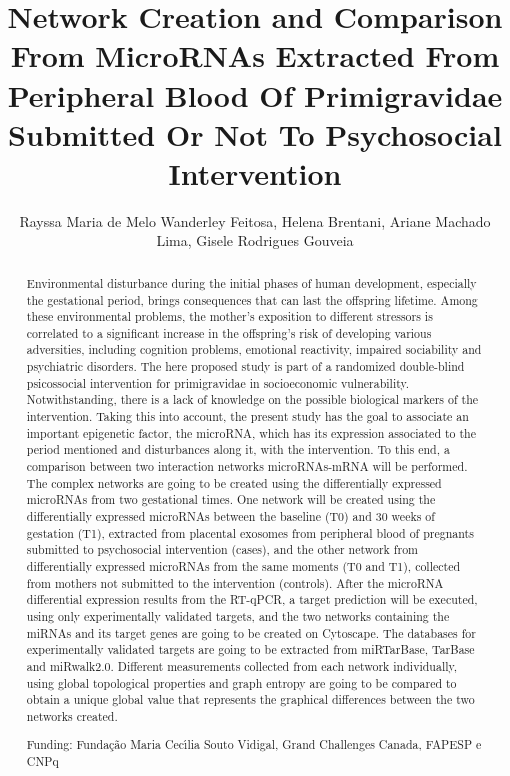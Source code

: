 \documentclass[twoside]{article}
\title{\vspace{-15mm}\fontsize{24pt}{10pt}\selectfont\textbf{ Network Creation and Comparison From MicroRNAs Extracted From Peripheral Blood Of Primigravidae Submitted Or Not To Psychosocial Intervention }} %
\author{ Rayssa Maria de Melo Wanderley Feitosa, Helena Brentani, Ariane Machado Lima, Gisele Rodrigues Gouveia }
\affil{ Universidade de S\~ao Paulo }
\date{}
\begin{document}
  
  
  \maketitle %
  
  
  \thispagestyle{fancy} %
  
  
  \begin{abstract}
  Environmental disturbance during the initial phases of human development,  especially the gestational period,  brings consequences that can last the offspring lifetime. Among these environmental problems,  the mother’s exposition to different stressors is correlated to a significant increase in the offspring’s risk of developing various adversities,  including cognition problems,  emotional reactivity,  impaired sociability and psychiatric disorders. The here proposed study is part of a randomized double-blind psicossocial intervention for primigravidae in socioeconomic vulnerability. Notwithstanding,  there is a lack of knowledge on the possible biological markers of the intervention. Taking this into account,  the present study has the goal to associate an important epigenetic factor,  the microRNA,  which has its expression associated to the period mentioned and disturbances along it,  with the intervention. To this end,  a comparison between two interaction networks microRNAs-mRNA will be performed. The complex networks are going to be created using the differentially expressed microRNAs from two gestational times. One network will be created using the differentially expressed microRNAs between the baseline (T0) and 30 weeks  of gestation (T1),  extracted from placental exosomes from peripheral blood of pregnants submitted to psychosocial intervention (cases),  and the other network from differentially expressed microRNAs from the same moments (T0 and T1),  collected from mothers not submitted to the intervention (controls). After the microRNA differential expression results from the RT-qPCR,  a target prediction will be executed,  using only experimentally validated targets,  and the two networks containing the miRNAs and its target genes are going to be created on Cytoscape. The databases for experimentally validated targets are going to be extracted from miRTarBase,  TarBase and miRwalk2.0. Different measurements collected from each network individually,  using global topological properties and graph entropy are going to be compared to obtain a unique global value that represents the graphical differences between the two networks created.
  
  Funding: Funda\c{c}\~ao Maria Cec\'{\i}lia Souto Vidigal,  Grand Challenges Canada,  FAPESP e CNPq \\ 
  \end{abstract}
  
\end{document}
